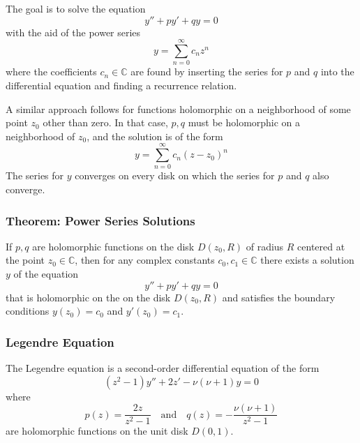 \documentclass[11pt, a4paper]{article}
\newcommand{\C}{\mathbb{C}} %
\begin{document}
The goal is to solve the equation
\begin{equation*}
	y'' + py' + qy = 0
\end{equation*}
with the aid of the power series
\begin{equation*}
	y = \sum_{n=0}^{\infty}c_nz^n
\end{equation*}
where the coefficients $ c_n \in \C $ are found by inserting the series for $ p $ and $ q $ into the differential equation and finding a recurrence relation.

A similar approach follows for functions holomorphic on a neighborhood of some point $ z_0 $ other than zero. In that case, $ p, q $ must be holomorphic on a neighborhood of $ z_0 $, and the solution is of the form
\begin{equation*}
	y = \sum_{n=0}^{\infty}c_n(z-z_0)^n
\end{equation*}
The series for $ y $ converges on every disk on which the series for $ p $ and $ q $ also converge.

\subsubsection{Theorem: Power Series Solutions}
If $ p, q $ are holomorphic functions on the disk $ D(z_0, R) $ of radius $ R $ centered at the point $ z_0 \in \C $, then for any complex constants $ c_0, c_1 \in \C $ there exists a solution $ y $ of the equation 
\begin{equation*}
	y'' + py' + qy = 0
\end{equation*}
that is holomorphic on the on the disk $ D(z_0, R) $ and satisfies the boundary conditions $ y(z_0) = c_0 $ and $ y'(z_0) = c_1 $.

\subsubsection{Legendre Equation}
The Legendre equation is a second-order differential equation of the form
\begin{equation*}
	(z^2 - 1)y'' + 2z' - \nu (\nu + 1) y = 0
\end{equation*}
where 
\begin{equation*}
	p(z) = \frac{2z}{z^2 - 1} \quad \text{and} \quad q(z) = - \frac{\nu (\nu + 1)}{z^2 - 1}
\end{equation*}
are holomorphic functions on the unit disk $ D(0, 1) $.
\end{document}
